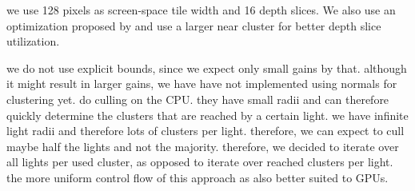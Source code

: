 \begin{outline}
\1 we use 128 pixels as screen-space tile width and 16 depth slices. We also use an optimization proposed by \citet{persson::2013::practical} and use a larger near cluster for better depth slice utilization.

\1 we do not use explicit bounds, since we expect only small gains by that. although it might result in larger gains, we have have not implemented using normals for clustering yet.
\1 \citet{???practical} do culling on the CPU. they have small radii and can therefore quickly determine the clusters that are reached by a certain light.
\1 we have infinite light radii and therefore lots of clusters per light. therefore, we can expect to cull maybe half the lights and not the majority.
\1 therefore, we decided to iterate over all lights per used cluster, as opposed to iterate over reached clusters per light.
\1 the more uniform control flow of this approach as also better suited to GPUs.



\end{outline}
